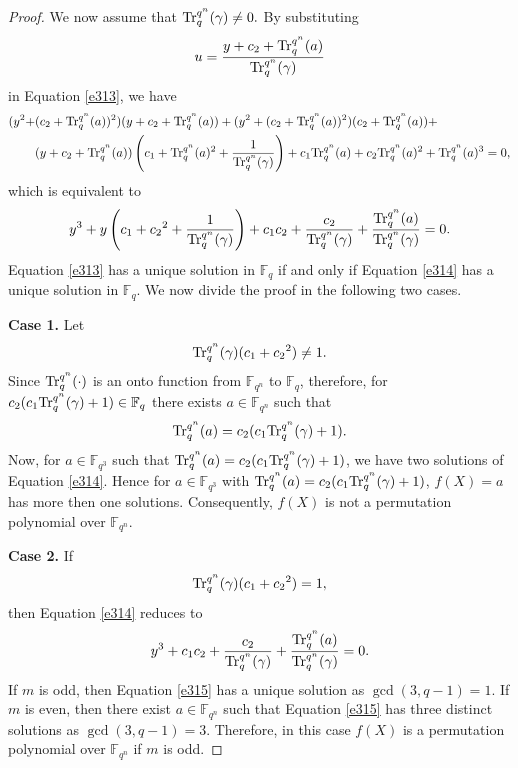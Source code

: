 \documentclass[11pt]{amsart}
\theoremstyle{plain}
\numberwithin{equation}{section}
\theoremstyle{definition}
\newcommand{\F}{\mathbb F}
\def\Tr{{\rm Tr}}
\begin{document}
\begin{proof}
   We now assume that $\Tr_{q}^{q^n}(\gamma)\neq 0.$ By substituting 
   $$u=\frac{y+c_2+\Tr_{q}^{q^n}(a)}{\Tr_{q}^{q^n}(\gamma)}$$
   in Equation \eqref{e313}, we have
   \begin{equation*}
       \begin{split}
           (y^2+&(c_2+\Tr_{q}^{q^n}(a))^2)(y+c_2+\Tr_{q}^{q^n}(a))+(y^2+(c_2+\Tr_{q}^{q^n}(a))^2)(c_2+\Tr_{q}^{q^n}(a))+\\&(y+c_2+\Tr_{q}^{q^n}(a))\left(c_1+\Tr_{q}^{q^n}(a)^2+\frac{1}{\Tr_{q}^{q^n}(\gamma)}\right)+c_1\Tr_{q}^{q^n}(a)+c_2\Tr_{q}^{q^n}(a)^2+\Tr_{q}^{q^n}(a)^3=0,
   \end{split}
   \end{equation*}
   which is equivalent to
   \begin{equation}\label{e314}
       y^3+y\left(c_1+{c_2}^2+\frac{1}{\Tr_{q}^{q^n}(\gamma)}\right)+c_1c_2+\frac{c_2}{\Tr_{q}^{q^n}(\gamma)}+\frac{\Tr_{q}^{q^n}(a)}{\Tr_{q}^{q^n}(\gamma)}=0.
   \end{equation}
   Equation \eqref{e313} has a unique solution in $\F_q$ if and only if Equation \eqref{e314} has a unique solution in $\F_q.$ We now divide the proof in the following two cases.

   \textbf{Case 1.} Let $$\Tr_{q}^{q^n}(\gamma)(c_1+{c_2}^2)\neq 1.$$ Since $\Tr_{q}^{q^n}(\cdot)$ is an onto function from $\F_{q^n}$ to $\F_q$, therefore, for $c_2(c_1\Tr_{q}^{q^n}(\gamma)+1) \in \F_q$ there exists $ a \in \F_{q^n}$ such that $$\Tr_{q}^{q^n}(a)=c_2(c_1\Tr_{q}^{q^n}(\gamma)+1).$$ Now, for $a \in \F_{q^3}$ such that  $\Tr_{q}^{q^n}(a)=c_2(c_1\Tr_{q}^{q^n}(\gamma)+1)$, we have two solutions of Equation \eqref{e314}. Hence for $a \in \F_{q^3}$ with $\Tr_{q}^{q^n}(a)=c_2(c_1\Tr_{q}^{q^n}(\gamma)+1)$, $f(X)=a$ has more then one solutions. Consequently, $f(X)$ is not a permutation polynomial over $\F_{q^n}.$

   \textbf{Case 2.} If $$\Tr_{q}^{q^n}(\gamma)(c_1+{c_2}^2)=1,$$ then Equation \eqref{e314} reduces to 
   \begin{equation}\label{e315}
       y^3+c_1c_2+\frac{c_2}{\Tr_{q}^{q^n}(\gamma)}+\frac{\Tr_{q}^{q^n}(a)}{\Tr_{q}^{q^n}(\gamma)}=0.
   \end{equation}
   If $m$ is odd, then Equation \eqref{e315} has a unique solution as $\gcd(3, q-1)=1.$ If $m$ is even, then there exist $a \in \F_{q^n}$ such that Equation  \eqref{e315} has three distinct solutions as $\gcd(3, q-1)=3.$ Therefore, in this case $f(X)$ is a permutation polynomial over $\F_{q^n}$ if $m$ is odd.

   \end{proof}
\end{document}

